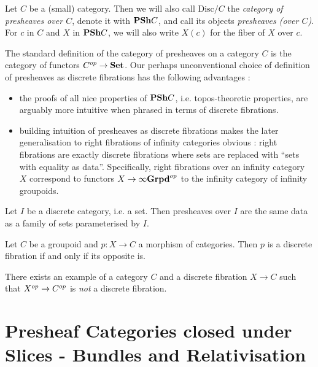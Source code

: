 \documentclass{article}
\begin{document}
\begin{dfn}
  
  Let $ C$ be a (small) category.
  Then we will also call $\mathrm{Disc}/ C$ the
  \emph{category of presheaves over $ C$},
  denote it with $\mathbf{PSh} C$,
  and call its objects \emph{presheaves (over $ C$)}.
  For $c$ in $C$ and $X$ in $\mathbf{PSh} C$,
  we will also write $X(c)$ for the fiber of $X$ over $c$.
\end{dfn}

\begin{rmk}
  The standard definition of the category of presheaves on a category $C$
  is the category of functors $C^{op} \to \mathbf{Set}$.
  Our perhaps unconventional choice of definition of presheaves as
  discrete fibrations has the following advantages : 
  \begin{itemize}
    \item the proofs of all nice properties of $\mathbf{PSh} C$,
    i.e. topos-theoretic properties, are arguably more intuitive
    when phrased in terms of discrete fibrations.
    \item building intuition of presheaves as discrete fibrations
    makes the later generalisation to right fibrations of infinity categories
    obvious : 
    right fibrations are exactly discrete fibrations
    where sets are replaced with ``sets with equality as data''.
    Specifically,
    right fibrations over an infinity category $X$
    correspond to functors $X \to \infty\mathbf{Grpd}^{op}$
    to the infinity category of infinity groupoids.
  \end{itemize}
\end{rmk}

\begin{eg}
  
  Let $I$ be a discrete category, i.e. a set.
  Then presheaves over $I$ are the same data as
  a family of sets parameterised by $I$.
\end{eg}

\begin{eg}
  Let $C$ be a groupoid and $p : X \to C$ a morphism of categories.
  Then $p$ is a discrete fibration if and only if its opposite is.

  There exists an example of a category $C$ and a discrete fibration $X \to C$
  such that $X^{op} \to C^{op}$ is \emph{not} a discrete fibration.
\end{eg}

\section{Presheaf Categories closed under Slices - 
  Bundles and Relativisation}
\end{document}
